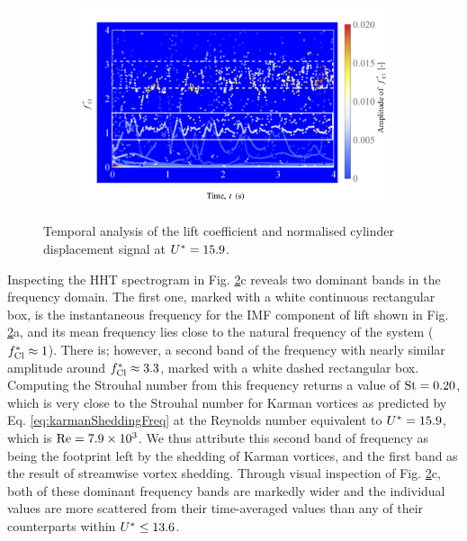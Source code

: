 \documentclass[oneside]{utmthesis}
\begin{document}
\begin{figure} \continuedfloat
  \centering
  \begin{subfigure}[h]{1\textwidth}
    \includegraphics[width=\textwidth]{figs/tempAnalysisTransition-c}
    \caption{}
    \label{fig:tempAnalysisTransition-c}
  \end{subfigure}
  \caption{Temporal analysis of the lift coefficient and normalised cylinder displacement signal at $U^{*} = 15.9$.}
  \label{fig:tempAnalysisTransition}
\end{figure}

Inspecting the HHT spectrogram in Fig. \ref{fig:tempAnalysisTransition}c reveals two dominant bands in the frequency domain. The first one, marked with a white continuous rectangular box, is the instantaneous frequency for the IMF component of lift shown in Fig. \ref{fig:tempAnalysisTransition}a, and its mean frequency lies close to the natural frequency of the system ($f_{\text{Cl}}^{*} \approx 1$). There is; however, a second band of the frequency with nearly similar amplitude around $f_{\text{Cl}}^{*} \approx 3.3$, marked with a white dashed rectangular box. Computing the Strouhal number from this frequency returns a value of $\text{St} = 0.20$, which is very close to the Strouhal number for Karman vortices as predicted by Eq. \ref{eq:karmanSheddingFreq} at the Reynolds number equivalent to $U^{*} = 15.9$, which is $\text{Re} = 7.9 \times 10^{3}$. We thus attribute this second band of frequency as being the footprint left by the shedding of Karman vortices, and the first band as the result of streamwise vortex shedding. Through visual inspection of Fig. \ref{fig:tempAnalysisTransition}c, both of these dominant frequency bands are markedly wider and the individual values are more scattered from their time-averaged values than any of their counterparts within $U^{*} \leq 13.6$.
\end{document}
